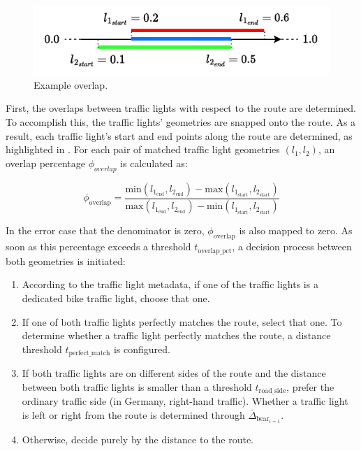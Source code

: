 \begin{figure}[b]
\centering
\includegraphics[width=0.5\linewidth]{images/overlap.drawio.pdf}
\caption{Example overlap.}
\label{fig:sg-matching-overlap-filter}
\end{figure}

First, the overlaps between traffic lights with respect to the route are determined. To accomplish this, the traffic lights' geometries are snapped onto the route. As a result, each traffic light's start and end points along the route are determined, as highlighted in . For each pair of matched traffic light geometries $(l_1, l_2)$, an overlap percentage $\phi_{overlap}$ is calculated as:

\begin{equation}
    \phi_{\text{overlap}} = \frac{\text{min}(l_{1_{\text{end}}}, l_{2_{\text{end}}}) - \text{max}(l_{1_{\text{start}}}, l_{2_{\text{start}}})}{\text{max}(l_{1_{\text{end}}}, l_{2_{\text{end}}}) - \text{min}(l_{1_{\text{start}}}, l_{2_{\text{start}}})}
\end{equation}

In the error case that the denominator is zero, $\phi_{\text{overlap}}$ is also mapped to zero. As soon as this percentage exceeds a threshold $t_{\text{overlap\_pct}}$, a decision process between both geometries is initiated:

\begin{enumerate}
    \item According to the traffic light metadata, if one of the traffic lights is a dedicated bike traffic light, choose that one.
    \item If one of both traffic lights perfectly matches the route, select that one. To determine whether a traffic light perfectly matches the route, a distance threshold $t_{\text{perfect\_match}}$ is configured.
    \item If both traffic lights are on different sides of the route and the distance between both traffic lights is smaller than a threshold $t_{\text{road\_side}}$, prefer the ordinary traffic side (in Germany, right-hand traffic). Whether a traffic light is left or right from the route is determined through $\bar{\Delta}_{\text{bear}_{i=1}}$.
    \item Otherwise, decide purely by the distance to the route.
\end{enumerate}

